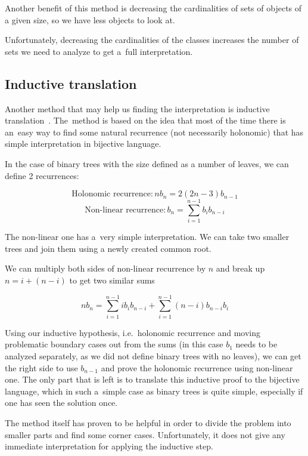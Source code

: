 \documentclass[final]{article}
\theoremstyle{definition}
\theoremstyle{definition}
\theoremstyle{remark}
\begin{document}
Another benefit of this method is decreasing the cardinalities of sets of objects of a given size, so we have less objects to look at.

Unfortunately, decreasing the cardinalities of the classes increases the number of sets we need to analyze to get a~full interpretation.

\subsection{Inductive translation}%
\label{sub:inductive_translation}

Another method that may help us finding the interpretation is inductive translation~\cite{doron}. The~method is based on the idea that most of the time there is an~easy way to find some natural recurrence (not necessarily holonomic) that has simple interpretation in bijective language.

In the case of binary trees with the size defined as a number of leaves, we can define 2 recurrences:

\[\text{Holonomic recurrence} : n b_{n} = 2 (2n - 3) b_{n - 1}\]
\[\text{Non-linear recurrence} : b_{n} = \sum_{i=1}^{n - 1} b_{i} b_{n - i}\]

The non-linear one has a~very simple interpretation. We can take two smaller trees and join them using a newly created common root.

We can multiply both sides of non-linear recurrence by \(n\) and break up \(n = i + (n - i)\) to get two similar sums

\[n b_{n} = \sum_{i=1}^{n - 1} i b_{i} b_{n - i} + \sum_{i=1}^{n - 1} (n - i) b_{n - i} b_{i}\]

Using our inductive hypothesis, i.e.~holonomic recurrence and moving problematic boundary cases out from the sums (in this case \(b_{1}\) needs to be analyzed separately, as we did not define binary trees with no leaves), we can get the right side to use \(b_{n - 1}\) and prove the holonomic recurrence using non-linear one. The only part that is left is to translate this inductive proof to the bijective language, which in such a~simple case as binary trees is quite simple, especially if one has seen the solution once.

The method itself has proven to be helpful in order to divide the problem into smaller parts and find some corner cases. Unfortunately, it does not give any immediate interpretation for applying the inductive step.
\end{document}
